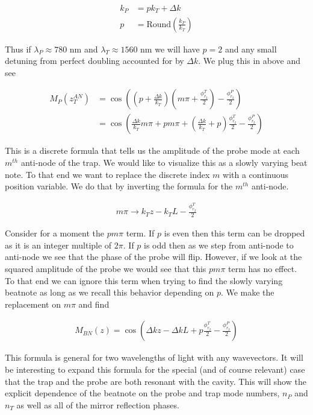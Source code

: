 \documentclass[12pt]{article}
\begin{document}
\begin{align}
k_P &= p k_T + \Delta k\\
p &= \text{Round}\left(\frac{k_P}{k_T}\right)
\end{align}

Thus if $\lambda_P \approx 780 \text{ nm}$ and $\lambda_T \approx 1560 \text{ nm}$ we will have $p=2$ and any small detuning from perfect doubling accounted for by $\Delta k$. We plug this in above and see

\begin{align}
M_P\left(z_T^{AN}\right) &= \cos\left(\left(p + \frac{\Delta k}{k_T} \right)\left(m\pi + \frac{\phi_{r_2}^T}{2}\right) - \frac{\phi_{r_2}^P}{2} \right)\\
&= \cos\left(\frac{\Delta k}{k_T} m\pi + pm \pi +\left(\frac{\Delta k}{k_T} + p\right)\frac{\phi_{r_2}^T}{2} - \frac{\phi_{r_2}^P}{2} \right) 
\end{align}

This is a discrete formula that tells us the amplitude of the probe mode at each $m^{th}$ anti-node of the trap. We would like to visualize this as a slowly varying beat note. To that end we want to replace the discrete index $m$ with a continuous position variable. We do that by inverting the formula for the $m^{th}$ anti-node.

\begin{align}
m\pi \rightarrow k_T z - k_T L - \frac{\phi_{r_2}^T}{2}
\end{align}

Consider for a moment the $pm \pi$ term. If $p$ is even then this term can be dropped as it is an integer multiple of $2\pi$. If $p$ is odd then as we step from anti-node to anti-node we see that the phase of the probe will flip. However, if we look at the squared amplitude of the probe we would see that this $pm \pi$ term has no effect. To that end we can ignore this term when trying to find the slowly varying beatnote as long as we recall this behavior depending on $p$. We make the replacement on $m\pi$ and find

\begin{align}
M_{BN}(z) = \cos\left(\Delta k z - \Delta k L + p\frac{\phi_{r_2}^T}{2} - \frac{\phi_{r_2}^P}{2} \right)
\end{align}

This formula is general for two wavelengths of light with any wavevectors. It will be interesting to expand this formula for the special (and of course relevant) case that the trap and the probe are both resonant with the cavity. This will show the explicit dependence of the beatnote on the probe and trap mode numbers, $n_P$ and $n_T$ as well as all of the mirror reflection phases.
\end{document}
